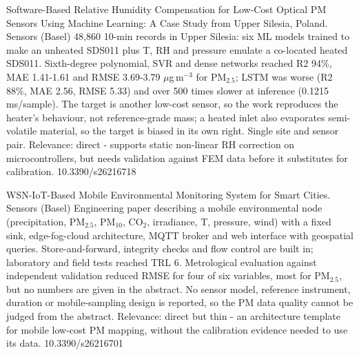 \documentclass[10pt]{article}
\begin{document}
{Software-Based Relative Humidity Compensation for Low-Cost Optical PM Sensors Using Machine Learning: A Case Study from Upper Silesia, Poland.}
{Sensors (Basel)}
{48,860 10-min records in Upper Silesia: six ML models trained to make an unheated SDS011 plus T, RH and pressure emulate a co-located heated SDS011. Sixth-degree polynomial, SVR and dense networks reached R2 94\%, MAE 1.41-1.61 and RMSE 3.69-3.79 $\mu$g\,m$^{-3}$ for PM$_{2.5}$; LSTM was worse (R2 88\%, MAE 2.56, RMSE 5.33) and over 500 times slower at inference (0.1215 ms/sample). The target is another low-cost sensor, so the work reproduces the heater's behaviour, not reference-grade mass; a heated inlet also evaporates semi-volatile material, so the target is biased in its own right. Single site and sensor pair. Relevance: direct - supports static non-linear RH correction on microcontrollers, but needs validation against FEM data before it substitutes for calibration.}
{10.3390/s26216718}

{WSN-IoT-Based Mobile Environmental Monitoring System for Smart Cities.}
{Sensors (Basel)}
{Engineering paper describing a mobile environmental node (precipitation, PM$_{2.5}$, PM$_{10}$, CO$_2$, irradiance, T, pressure, wind) with a fixed sink, edge-fog-cloud architecture, MQTT broker and web interface with geospatial queries. Store-and-forward, integrity checks and flow control are built in; laboratory and field tests reached TRL 6. Metrological evaluation against independent validation reduced RMSE for four of six variables, most for PM$_{2.5}$, but no numbers are given in the abstract. No sensor model, reference instrument, duration or mobile-sampling design is reported, so the PM data quality cannot be judged from the abstract. Relevance: direct but thin - an architecture template for mobile low-cost PM mapping, without the calibration evidence needed to use its data.}
{10.3390/s26216701}
\end{document}
